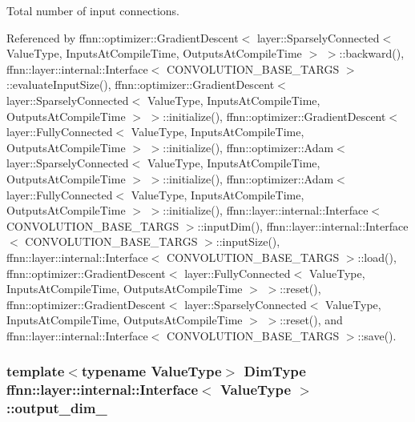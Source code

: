 Total number of input connections. 



Referenced by ffnn\-::optimizer\-::\-Gradient\-Descent$<$ layer\-::\-Sparsely\-Connected$<$ Value\-Type, Inputs\-At\-Compile\-Time, Outputs\-At\-Compile\-Time $>$ $>$\-::backward(), ffnn\-::layer\-::internal\-::\-Interface$<$ C\-O\-N\-V\-O\-L\-U\-T\-I\-O\-N\-\_\-\-B\-A\-S\-E\-\_\-\-T\-A\-R\-G\-S $>$\-::evaluate\-Input\-Size(), ffnn\-::optimizer\-::\-Gradient\-Descent$<$ layer\-::\-Sparsely\-Connected$<$ Value\-Type, Inputs\-At\-Compile\-Time, Outputs\-At\-Compile\-Time $>$ $>$\-::initialize(), ffnn\-::optimizer\-::\-Gradient\-Descent$<$ layer\-::\-Fully\-Connected$<$ Value\-Type, Inputs\-At\-Compile\-Time, Outputs\-At\-Compile\-Time $>$ $>$\-::initialize(), ffnn\-::optimizer\-::\-Adam$<$ layer\-::\-Sparsely\-Connected$<$ Value\-Type, Inputs\-At\-Compile\-Time, Outputs\-At\-Compile\-Time $>$ $>$\-::initialize(), ffnn\-::optimizer\-::\-Adam$<$ layer\-::\-Fully\-Connected$<$ Value\-Type, Inputs\-At\-Compile\-Time, Outputs\-At\-Compile\-Time $>$ $>$\-::initialize(), ffnn\-::layer\-::internal\-::\-Interface$<$ C\-O\-N\-V\-O\-L\-U\-T\-I\-O\-N\-\_\-\-B\-A\-S\-E\-\_\-\-T\-A\-R\-G\-S $>$\-::input\-Dim(), ffnn\-::layer\-::internal\-::\-Interface$<$ C\-O\-N\-V\-O\-L\-U\-T\-I\-O\-N\-\_\-\-B\-A\-S\-E\-\_\-\-T\-A\-R\-G\-S $>$\-::input\-Size(), ffnn\-::layer\-::internal\-::\-Interface$<$ C\-O\-N\-V\-O\-L\-U\-T\-I\-O\-N\-\_\-\-B\-A\-S\-E\-\_\-\-T\-A\-R\-G\-S $>$\-::load(), ffnn\-::optimizer\-::\-Gradient\-Descent$<$ layer\-::\-Fully\-Connected$<$ Value\-Type, Inputs\-At\-Compile\-Time, Outputs\-At\-Compile\-Time $>$ $>$\-::reset(), ffnn\-::optimizer\-::\-Gradient\-Descent$<$ layer\-::\-Sparsely\-Connected$<$ Value\-Type, Inputs\-At\-Compile\-Time, Outputs\-At\-Compile\-Time $>$ $>$\-::reset(), and ffnn\-::layer\-::internal\-::\-Interface$<$ C\-O\-N\-V\-O\-L\-U\-T\-I\-O\-N\-\_\-\-B\-A\-S\-E\-\_\-\-T\-A\-R\-G\-S $>$\-::save().

\hypertarget{classffnn_1_1layer_1_1internal_1_1_interface_a2540e4455843a2100efe4c7de9a62df0}{
\subsubsection[{output\-\_\-dim\-\_\-}]{\setlength{\rightskip}{0pt plus 5cm}template$<$typename Value\-Type$>$ {\bf Dim\-Type} {\bf ffnn\-::layer\-::internal\-::\-Interface}$<$ Value\-Type $>$\-::output\-\_\-dim\-\_\-\hspace{0.3cm}{\ttfamily [protected]}}}\label{classffnn_1_1layer_1_1internal_1_1_interface_a2540e4455843a2100efe4c7de9a62df0}


